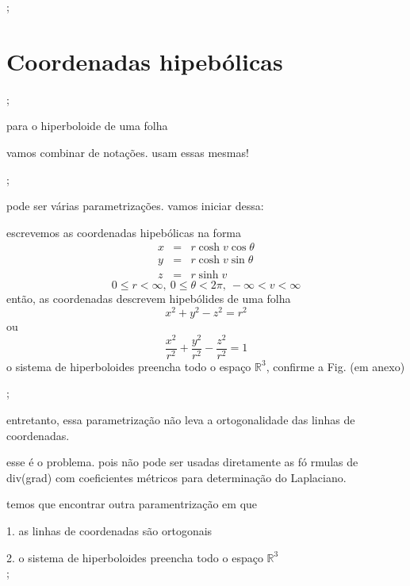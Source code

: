 \documentclass[a4paper,12pt]{article}
\begin{document}
;

\section{Coordenadas hipeb\'{o}licas}

;

para o hiperboloide de uma folha

vamos combinar de nota\c{c}\~{o}es. usam essas mesmas! 

;

pode ser v\'{a}rias parametriza\c{c}\~{o}es. vamos iniciar dessa:

escrevemos as coordenadas hipeb\'{o}licas na forma 
\begin{eqnarray*}
x &=&r\cosh v\cos \theta  \\
y &=&r\cosh v\sin \theta  \\
z &=&r\sinh v
\end{eqnarray*}%
\begin{equation*}
0\leq r<\infty ,\ 0\leq \theta <2\pi ,\ -\infty <v<\infty 
\end{equation*}%
ent\~{a}o, as coordenadas descrevem hipeb\'{o}lides de uma folha%
\begin{equation*}
x^{2}+y^{2}-z^{2}=r^{2}
\end{equation*}%
ou%
\begin{equation*}
\frac{x^{2}}{r^{2}}+\frac{y^{2}}{r^{2}}-\frac{z^{2}}{r^{2}}=1
\end{equation*}%
o sistema de hiperboloides preencha todo o espa\c{c}o $\mathbb{R}^{3}$,
confirme a Fig. (em anexo)

;

entretanto, essa parametriza\c{c}\~{a}o n\~{a}o leva a ortogonalidade das
linhas de coordenadas. 

esse \'{e} o problema. pois n\~{a}o pode ser usadas diretamente as f\'{o}%
rmulas de div(grad) com coeficientes m\'{e}tricos para determina\c{c}\~{a}o
do Laplaciano.

temos que encontrar outra paramentriza\c{c}\~{a}o em que 

1. as linhas de coordenadas s\~{a}o ortogonais

2. o sistema de hiperboloides preencha todo o espa\c{c}o $\mathbb{R}^{3}$%
\begin{equation*}
\end{equation*}%
;
\end{document}

